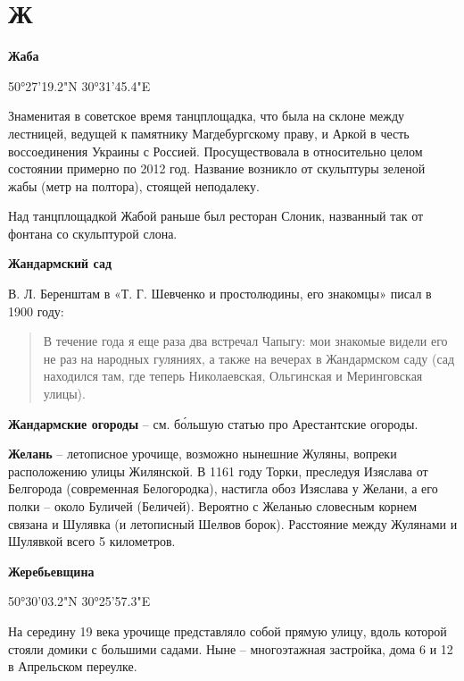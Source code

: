 \chapter*{Ж}

\textbf{Жаба}

50°27'19.2"N 30°31'45.4"E

Знаменитая в советское время танцплощадка, что была на склоне между лестницей, ведущей к памятнику Магдебургскому праву, и Аркой в честь воссоединения Украины с Россией. Просуществовала в относительно целом состоянии  примерно по 2012 год. Название возникло от скульптуры зеленой жабы (метр на полтора), стоящей неподалеку.

Над танцплощадкой Жабой раньше был ресторан Слоник, названный так от фонтана со скульптурой слона.\\

\medskip

\textbf{Жандармский сад} 

В. Л. Беренштам в «Т. Г. Шевченко и простолюдины, его знакомцы» писал в 1900 году:

\begin{quotation}
В течение года я еще раза два встречал Чапыгу: мои знакомые видели его не раз на народных гуляниях, а также на вечерах в Жандармском саду (сад находился там, где теперь Николаевская, Ольгинская и Меринговская улицы).
\end{quotation}

\medskip

\textbf{Жандармские огороды} – см. б\'ольшую статью про Арестантские огороды.\\

\medskip


\textbf{Желань} – летописное урочище, возможно нынешние Жуляны, вопреки расположению улицы Жилянской. В 1161 году Торки, преследуя Изяслава от Белгорода (современная Белогородка), настигла обоз Изяслава у Желани, а его полки – около Буличей (Беличей). Вероятно с Желанью словесным корнем связана и Шулявка (и летописный Шелвов борок). Расстояние между Жулянами и Шулявкой всего 5 километров.\\ 

\medskip

\textbf{Жеребьевщина}

50°30'03.2"N 30°25'57.3"E

На середину 19 века урочище представляло собой прямую улицу, вдоль которой стояли домики с большими садами. Ныне – многоэтажная застройка, дома 6 и 12 в Апрельском переулке.

